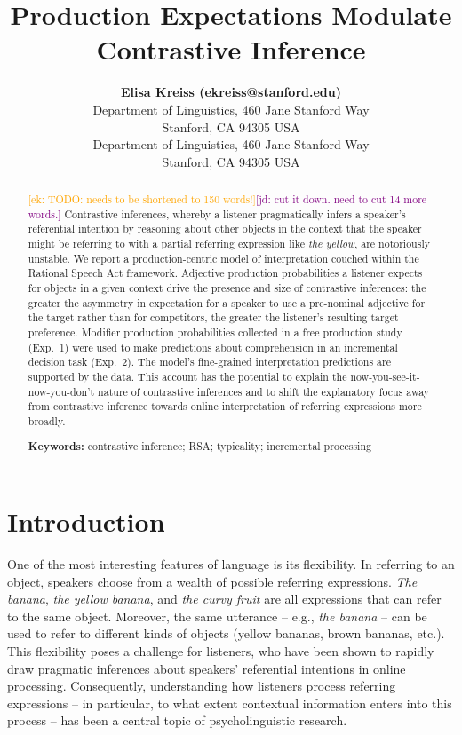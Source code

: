 \documentclass[10pt,letterpaper]{article}
\title{Production Expectations Modulate Contrastive Inference}
\author{{\large \bf Elisa Kreiss (ekreiss@stanford.edu)} \\
  Department of Linguistics, 460 Jane Stanford Way \\
  Stanford, CA 94305 USA
  \AND {\large \bf Judith Degen (jdegen@stanford.edu)} \\
  Department of Linguistics, 460 Jane Stanford Way \\
  Stanford, CA 94305 USA}
\newcommand{\ek}[1]{\textcolor{Orange}{[ek: #1]}}
\newcommand{\jd}[1]{\textcolor{Purple}{[jd: #1]}}
\begin{document}
\maketitle

\begin{abstract}
\ek{TODO: needs to be shortened to 150 words!}\jd{cut it down. need to cut 14 more words.}
Contrastive inferences, whereby a listener pragmatically infers a speaker's  referential intention by reasoning about other objects in the context that the speaker might be referring to with a partial referring expression like \emph{the yellow}, are notoriously unstable. We report a production-centric model of interpretation couched within the Rational Speech Act framework. Adjective production probabilities a listener expects for objects in a given context drive the presence and size of contrastive inferences: the greater the asymmetry in expectation for a speaker to use a pre-nominal adjective for the target rather than for competitors, the greater the listener's resulting  target preference. Modifier production probabilities collected in a free production study (Exp.~1) were used to make predictions about comprehension in an incremental decision task (Exp.~2). The model's fine-grained interpretation predictions are supported by the data. This account has the potential to explain the now-you-see-it-now-you-don't nature of contrastive inferences and to shift the explanatory focus away from contrastive inference towards online interpretation of referring expressions more broadly.


\textbf{Keywords:} 
contrastive inference; RSA; typicality; incremental processing
\end{abstract}

\section{Introduction}

One of the most interesting features of language is its flexibility. In referring to an object, speakers choose from a wealth of possible referring expressions. \textit{The banana}, \textit{the yellow banana}, and \textit{the curvy fruit}  are all expressions that can refer to the same object. Moreover, the same utterance -- e.g., \textit{the banana} -- can be used to refer to different kinds of objects (yellow bananas, brown bananas, etc.). This flexibility poses a challenge for listeners, who have been shown to rapidly draw pragmatic inferences about speakers' referential intentions in online processing. Consequently, understanding how listeners process referring expressions -- in particular, to what extent contextual information enters into this process -- has been a central topic of psycholinguistic research.
\end{document}
